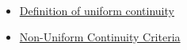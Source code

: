 \begin{remark*}[Dependencies]~\\
\begin{itemize}
  \item \hyperref[def:uniform-continuity]{Definition of uniform continuity}
  \item \hyperref[prop:non-uniform-continuity-criteria]{Non-Uniform Continuity Criteria}
\end{itemize}
\end{remark*}

\clearpage
